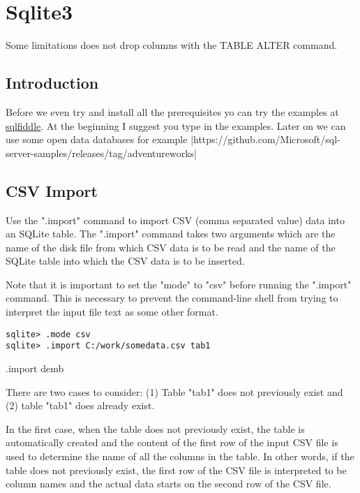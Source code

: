 

\chapter{Sqlite3}

Some limitations does not drop columns with the TABLE ALTER command.

\section{Introduction}

Before we even try and install all the prerequisites yo can try the examples at
\href{http://sqlfiddle.com/about.html}{sqlfiddle}. At the beginning I suggest you type in the examples. Later on we can use
some open data databases for example |https://github.com/Microsoft/sql-server-samples/releases/tag/adventureworks|



\section{CSV Import}

Use the ".import" command to import CSV (comma separated value) data into an SQLite table. The ".import" command takes two arguments which are the name of the disk file from which CSV data is to be read and the name of the SQLite table into which the CSV data is to be inserted.

Note that it is important to set the "mode" to "csv" before running the ".import" command. This is necessary to prevent the command-line shell from trying to interpret the input file text as some other format.


\begin{verbatim}
sqlite> .mode csv
sqlite> .import C:/work/somedata.csv tab1
\end{verbatim}

.import demb

There are two cases to consider: (1) Table "tab1" does not previously exist and (2) table "tab1" does already exist.

In the first case, when the table does not previously exist, the table is automatically created and the content of the first row of the input CSV file is used to determine the name of all the columns in the table. In other words, if the table does not previously exist, the first row of the CSV file is interpreted to be column names and the actual data starts on the second row of the CSV file.

